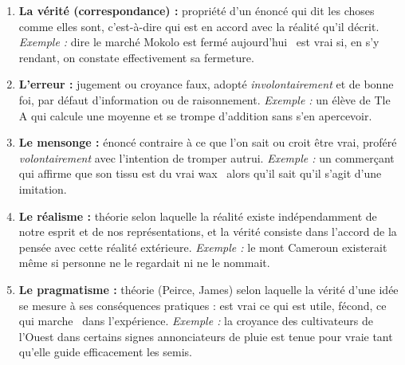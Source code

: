 \documentclass[11pt]{article}
\begin{document}
\begin{corrige}
\begin{enumerate}
\item \textbf{La vérité (correspondance) :} propriété d'un énoncé qui dit les choses comme elles sont, c'est-à-dire qui est en accord avec la réalité qu'il décrit. \emph{Exemple :} dire \guillemotleft le marché Mokolo est fermé aujourd'hui \guillemotright\ est vrai si, en s'y rendant, on constate effectivement sa fermeture.
\item \textbf{L'erreur :} jugement ou croyance faux, adopté \emph{involontairement} et de bonne foi, par défaut d'information ou de raisonnement. \emph{Exemple :} un élève de Tle A qui calcule une moyenne et se trompe d'addition sans s'en apercevoir.
\item \textbf{Le mensonge :} énoncé contraire à ce que l'on sait ou croit être vrai, proféré \emph{volontairement} avec l'intention de tromper autrui. \emph{Exemple :} un commerçant qui affirme que son tissu est du \guillemotleft vrai wax \guillemotright\ alors qu'il sait qu'il s'agit d'une imitation.
\item \textbf{Le réalisme :} théorie selon laquelle la réalité existe indépendamment de notre esprit et de nos représentations, et la vérité consiste dans l'accord de la pensée avec cette réalité extérieure. \emph{Exemple :} le mont Cameroun existerait même si personne ne le regardait ni ne le nommait.
\item \textbf{Le pragmatisme :} théorie (Peirce, James) selon laquelle la vérité d'une idée se mesure à ses conséquences pratiques : est vrai ce qui est utile, fécond, ce qui \guillemotleft marche \guillemotright\ dans l'expérience. \emph{Exemple :} la croyance des cultivateurs de l'Ouest dans certains signes annonciateurs de pluie est tenue pour vraie tant qu'elle guide efficacement les semis.
\end{enumerate}
\end{corrige}
\end{document}
